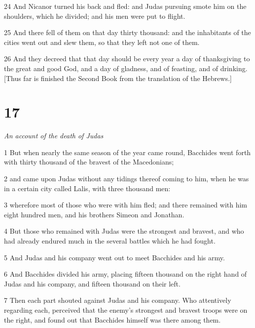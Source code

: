 \par 24 And Nicanor turned his back and fled: and Judas pursuing smote him on the shoulders, which he divided; and his men were put to flight. 

\par 25 And there fell of them on that day thirty thousand: and the inhabitants of the cities went out and slew them, so that they left not one of them.

\par 26 And they decreed that that day should be every year a day of thanksgiving to the great and good God, and a day of gladness, and of feasting, and of drinking. [Thus far is finished the Second Book from the translation of the Hebrews.] 

\chapter{17}

\par \textit{An account of the death of Judas}

\par 1 But when nearly the same season of the year came round, Bacchides went forth with thirty thousand of the bravest of the Macedonians; 

\par 2 and came upon Judas without any tidings thereof coming to him, when he was in a certain city called Lalis, with three thousand men: 

\par 3 wherefore most of those who were with him fled; and there remained with him eight hundred men, and his brothers Simeon and Jonathan. 

\par 4 But those who remained with Judas were the strongest and bravest, and who had already endured much in the several battles which he had fought. 

\par 5 And Judas and his company went out to meet Bacchides and his army. 

\par 6 And Bacchides divided his army, placing fifteen thousand on the right hand of Judas and his company, and fifteen thousand on their left. 

\par 7 Then each part shouted against Judas and his company. Who attentively regarding each, perceived that the enemy’s strongest and bravest troops were on the right, and found out that Bacchides himself was there among them. 

